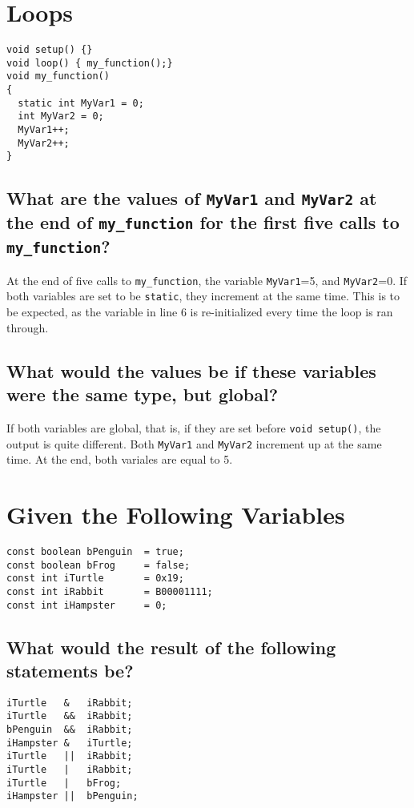 \documentclass{hw}
\begin{document}
\section{Loops}
\begin{lstlisting}
void setup() {}
void loop() { my_function();}
void my_function()
{
  static int MyVar1 = 0;
  int MyVar2 = 0;
  MyVar1++;
  MyVar2++;
}
\end{lstlisting}
\subsection{What are the values of \texttt{MyVar1} and \texttt{MyVar2} at the end
of \texttt{my\_function} for the first five calls to \texttt{my\_function}?}
At the end of five calls to \texttt{my\_function}, the variable
\texttt{MyVar1}=5, and \texttt{MyVar2}=0. If both variables are set to be
\texttt{static}, they increment at the same time. This is to be expected, 
as the variable in line 6 is re-initialized every time the loop is ran
through.
\subsection{What would the values be if these variables were the same type, but
global?}
If both variables are global, that is, if they are set before \texttt{void
setup()}, the output is quite different. Both \texttt{MyVar1} and
\texttt{MyVar2} increment up at the same time. At the end, both variales are
equal to 5.

\section{Given the Following Variables}
\begin{lstlisting}
const boolean bPenguin  = true;
const boolean bFrog     = false;
const int iTurtle       = 0x19;
const int iRabbit       = B00001111;
const int iHampster     = 0;
\end{lstlisting}
\newpage
\subsection{What would the result of the following statements be?}
\begin{lstlisting}
iTurtle   &   iRabbit;
iTurtle   &&  iRabbit;
bPenguin  &&  iRabbit;
iHampster &   iTurtle;
iTurtle   ||  iRabbit;
iTurtle   |   iRabbit;
iTurtle   |   bFrog;
iHampster ||  bPenguin;
\end{lstlisting}
\end{document}

